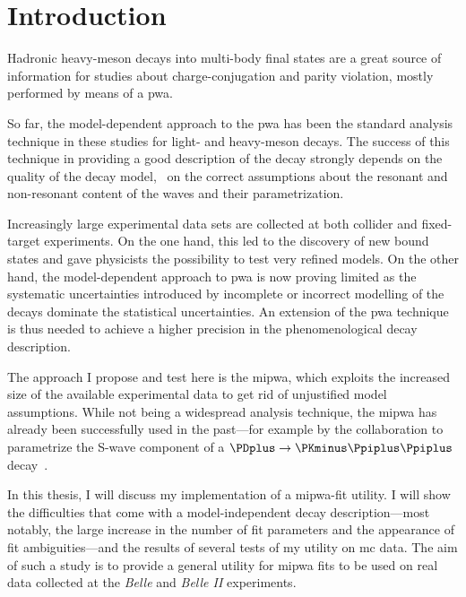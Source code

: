 \chapter{Introduction}
\label{chap:introduction}

    Hadronic heavy-meson decays into multi-body final states are a great source of information for studies about charge-conjugation and parity violation, mostly performed by means of a \ac{pwa}.


    So far, the model-dependent approach to the \ac{pwa} has been the standard analysis technique in these studies for light- and heavy-meson decays.
    The success of this technique in providing a good description of the decay strongly depends on the quality of the decay model, \ie~on the correct assumptions about the resonant and non-resonant content of the waves and their parametrization.


    Increasingly large experimental data sets are collected at both collider and fixed-target experiments.
    On the one hand, this led to the discovery of new bound states and gave physicists the possibility to test very refined models.
    On the other hand, the model-dependent approach to \ac{pwa} is now proving limited as the systematic uncertainties introduced by incomplete or incorrect modelling of the decays dominate the statistical uncertainties.
    An extension of the \ac{pwa} technique is thus needed to achieve a higher precision in the phenomenological decay description.


    The approach I propose and test here is the \ac{mipwa}, which exploits the increased size of the available experimental data to get rid of unjustified model assumptions.
    While not being a widespread analysis technique, the \ac{mipwa} has already been successfully used in the past---for example by the \focus{} collaboration to parametrize the S-wave component of a $\PDplus\to\PKminus\Ppiplus\Ppiplus$ decay~\cite{Link200914}.


    In this thesis, I will discuss my implementation of a \ac{mipwa}-fit utility.
    I will show the difficulties that come with a model-independent decay description---most notably, the large increase in the number of fit parameters and the appearance of fit ambiguities---and the results of several tests of my utility on \ac{mc} data.
    The aim of such a study is to provide a general utility for \ac{mipwa} fits to be used on real data collected at the \textsl{Belle} and \textsl{Belle II} experiments.


